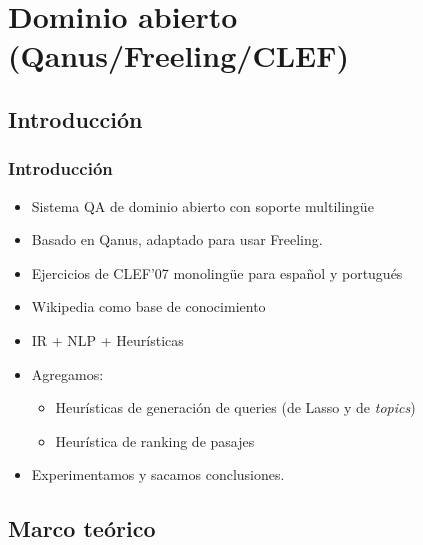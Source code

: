 \fontsize{9.5pt}{7.2}\selectfont

\section{Dominio abierto (Qanus/Freeling/CLEF)}

\subsection{Introducción}

\begin{frame}[<+->]
\frametitle{Introducción}
  \begin{itemize}
    \item Sistema QA de dominio abierto con soporte multilingüe
    \item Basado en Qanus, adaptado para usar Freeling.
    \item Ejercicios de CLEF'07 monolingüe para español y portugués
    \item Wikipedia como base de conocimiento
    \item IR + NLP + Heurísticas
    \item Agregamos: 
    \begin{itemize}
        \item Heurísticas de generación de queries (de Lasso y de \textit{topics})
        \item Heurística de ranking de pasajes
    \end{itemize}
    \item Experimentamos y sacamos conclusiones.
  \end{itemize}

\end{frame}

\subsection{Marco teórico}


